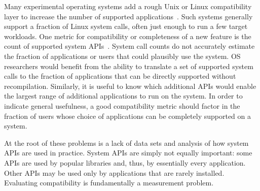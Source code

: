 Many experimental operating systems add a rough Unix or Linux compatibility 
layer to increase the number of supported applications~\cite{zeldovich+histar, aviram10determinator, xax, appavoo2003providing}.
Such systems generally support a fraction of Linux system calls,
often just enough 
to run a few target workloads.
One metric for compatibility or completeness of a new feature
is the count of supported system APIs~\cite{tsai14graphene, TxOS, baumann13bascule, bergan10dos}.
System call counts do not accurately
estimate the fraction of applications or users that could plausibly use the system.
OS researchers would benefit from
the ability to translate
a set of supported system calls 
to the fraction of applications that
can be directly supported without recompilation.  Similarly, it is useful 
to know which additional APIs would enable the largest range of additional applications to run on the system.
In order to indicate general usefulness, a 
good compatibility metric should factor in 
the fraction of users whose choice of applications can be
completely supported on a system.


At the root of these problems is a lack of data sets and analysis of
how system APIs are used in practice.
System APIs are simply not equally important: 
some APIs are used by popular libraries and, thus, by essentially every application.
Other APIs may be used only by applications that are rarely installed.
Evaluating compatibility is fundamentally a measurement problem.

